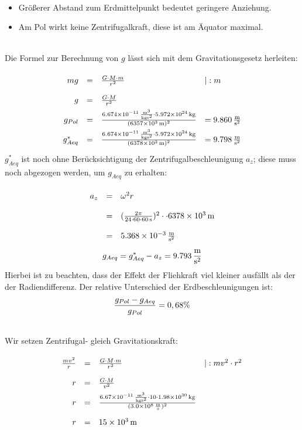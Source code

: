 \documentclass[a4paper]{article}
\begin{document}
\vspace{0.5 cm}

\\
\begin{itemize}
	\item Größerer Abstand zum Erdmittelpunkt bedeutet geringere Anziehung.
	\item Am  Pol wirkt keine Zentrifugalkraft, diese ist am Äquator maximal.
\end{itemize}
\vspace{0.5 cm}

\\
Die Formel zur Berechnung von $g$ lässt sich mit dem Gravitationsgesetz herleiten:
$$
\renewcommand{\arraystretch}{2}
\begin{array}{rcll}
 m g &=& {G \cdot M \cdot m \over r^2} &|:m \\
 g &=& {G \cdot M \over r^2} \\
 g_{Pol} &=& {\SI{6,674e-11}{{\meter^3} \over {\kilogram\second^2}} \cdot\SI{5,972e24}{\kilogram} \over ({\SI{6357e3}{\meter}})^2 }&=\SI{9,860}{\meter \over{ \second^2}}\\
  g_{Aeq}^* &=& {\SI{6,674e-11}{{\meter^3} \over {\kilogram\second^2}} \cdot\SI{5,972e24}{\kilogram} \over ({\SI{6378e3}{\meter}})^2 }&=\SI{9,798}{\meter \over{ \second^2}}\\
\end{array}
$$
$g_{Aeq}^*$ ist noch ohne Berücksichtigung der Zentrifugalbeschleunigung $a_z$; diese muss noch abgezogen werden, um $g_{Aeq}$ zu erhalten:
$$
\renewcommand{\arraystretch}{2}
\begin{array}{rcll}
 a_z &=& {\omega^2 r}\\
     &=& ({2 \pi \over 24 \cdot 60 \cdot \SI{60}{\second}})^2 \cdot  \cdot\SI{6378e3}{\meter}\\
     &=& \SI{5,368e-3}{\meter \over{ \second^2}}
\end{array}
$$
$$g_{Aeq} = g_{Aeq}^* -  a_z = \SI{9,793}{\meter \over{ \second^2}}$$
Hierbei ist zu beachten, dass der Effekt der Fliehkraft viel kleiner ausfällt als der der Radiendifferenz.
Der relative Unterschied der Erdbeschleunigungen ist:
$${g_{Pol}-g_{Aeq}\over g_{Pol}}=0,68\%$$
\vspace{0.5 cm}

\\
Wir setzen Zentrifugal- gleich Gravitationskraft:
$$
\renewcommand{\arraystretch}{2}
\begin{array}{rcll}
{m v^2 \over r} &=& {G  \cdot M \cdot m \over r^2} &|:m v^2 \cdot r^2 \\
r &=& { G \cdot M \over v^2}\\
r &=& {  \SI{6,67e-11}{{\meter^3} \over {\kilogram\second^2}} \cdot 10 \cdot\SI{1,98e30}{\kilogram} \over (\SI{3,0e8}{\meter\over \second})^2} \\
r &=& \SI{15e3}{\meter}
\end{array}
$$
\vspace{0.5 cm}
\end{document}
